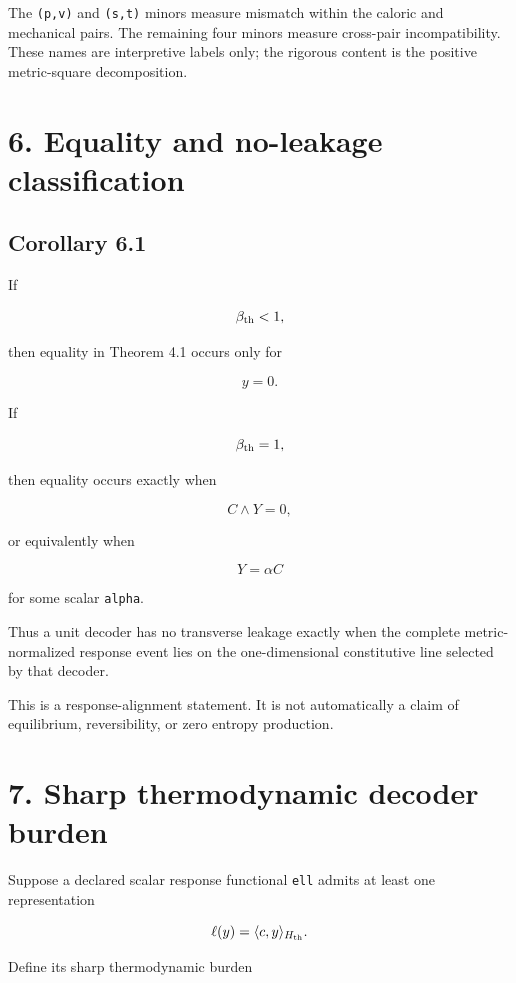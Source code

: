 The \texttt{(p,v)} and \texttt{(s,t)} minors measure mismatch within the caloric and mechanical pairs. The remaining four minors measure cross-pair incompatibility. These names are interpretive labels only; the rigorous content is the positive metric-square decomposition.

\hypertarget{equality-and-no-leakage-classification}{%
\section{6. Equality and no-leakage classification}\label{equality-and-no-leakage-classification}}

\hypertarget{corollary-6.1}{%
\subsection{Corollary 6.1}\label{corollary-6.1}}

If

\[
\beta_{\rm th}<1,
\]

then equality in Theorem 4.1 occurs only for

\[
y=0.
\]

If

\[
\beta_{\rm th}=1,
\]

then equality occurs exactly when

\[
C\wedge Y=0,
\]

or equivalently when

\[
Y=\alpha C
\]

for some scalar \texttt{alpha}.

Thus a unit decoder has no transverse leakage exactly when the complete metric-normalized response event lies on the one-dimensional constitutive line selected by that decoder.

This is a response-alignment statement. It is not automatically a claim of equilibrium, reversibility, or zero entropy production.

\hypertarget{sharp-thermodynamic-decoder-burden}{%
\section{7. Sharp thermodynamic decoder burden}\label{sharp-thermodynamic-decoder-burden}}

Suppose a declared scalar response functional \texttt{ell} admits at least one representation

\[
\ell(y)=\langle c,y\rangle_{H_{\rm th}}.
\]

Define its sharp thermodynamic burden

